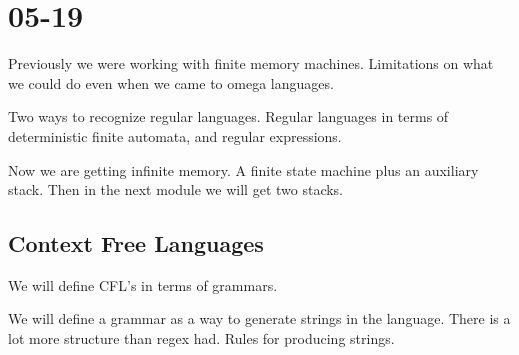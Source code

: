 \documentclass[../598comp.tex]{subfiles}
\date{05-19}
\begin{document}
\section{05-19}

Previously we were working with finite memory machines. Limitations on what we
could do even when we came to omega languages.

Two ways to recognize regular languages.
Regular languages in terms of deterministic finite automata, and regular expressions.

Now we are getting infinite memory. A finite state machine plus an auxiliary
stack. Then in the next module we will get two stacks.

\subsection{Context Free Languages}
We will define CFL's in terms of grammars.

We will define a grammar as a way to generate strings in the language. There is
a lot more structure than regex had. Rules for producing strings.
\end{document}
